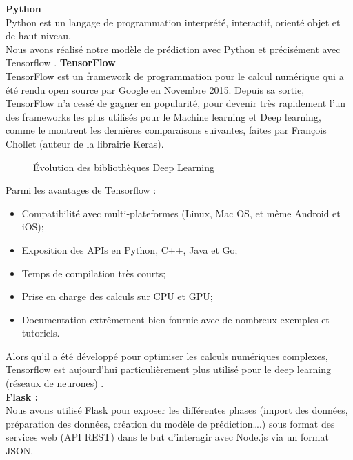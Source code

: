 \textbf{Python}\\
Python est un langage de programmation interprété, interactif, orienté objet et de haut niveau.\\ Nous avons réalisé notre modèle de prédiction avec Python et précisément avec Tensorflow \cite{Python}.
\newpage
\textbf{TensorFlow}\\
TensorFlow est un framework de programmation pour le calcul numérique qui a été rendu open source par Google en Novembre 2015. Depuis sa sortie, TensorFlow n’a cessé de gagner en popularité, pour devenir très rapidement l’un des frameworks les plus utilisés pour le Machine learning et Deep learning, comme le montrent les dernières comparaisons suivantes, faites par François Chollet (auteur de la librairie Keras).

\begin{figure}[htpb]
    \centering
    \caption{Évolution des bibliothèques Deep Learning}
    \label{fig:tensorflowDeepLearning}
    \end{figure}

Parmi les avantages de Tensorflow : 
\begin{itemize}
    \item Compatibilité avec multi-plateformes (Linux, Mac OS, et même Android et iOS);
    
    \item Exposition des APIs en Python, C++, Java et Go;
    
      \item Temps de compilation très courts;
      
      \item Prise en charge des calculs sur CPU et GPU;
      
      \item Documentation extrêmement bien fournie avec de nombreux exemples et tutoriels.
   
    \end{itemize}
Alors qu'il a été développé pour optimiser les calculs numériques complexes, Tensorflow est aujourd’hui particulièrement plus utilisé pour le deep learning (réseaux de neurones) \cite{Tensorflow}.
\\
\textbf{Flask :}\\
Nous avons utilisé Flask pour exposer les différentes phases (import des données, préparation des données, création du modèle de prédiction….) sous format des services web (API REST) dans le but d’interagir avec Node.js via un format JSON.

